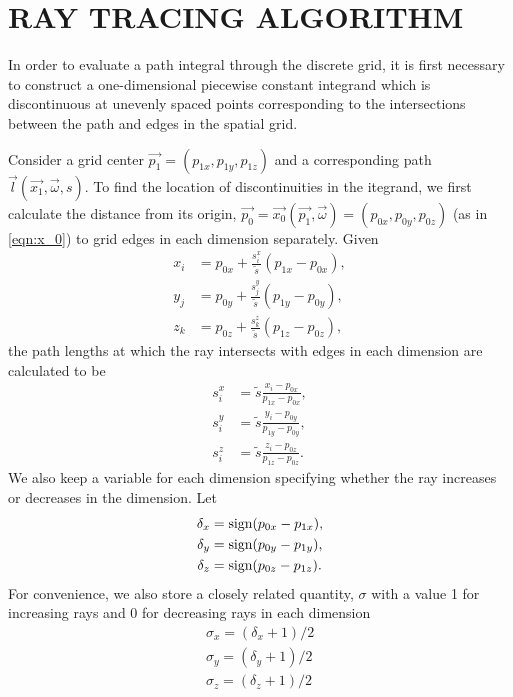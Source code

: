 \chapter{RAY TRACING ALGORITHM}
\label{chap:ray_tracing}


In order to evaluate a path integral through the discrete grid, it
is first necessary to construct a one-dimensional piecewise constant integrand
which is discontinuous at unevenly spaced points corresponding to the
intersections between the path and edges in the spatial grid.

Consider a grid center $\vec{p_1} = (p_{1x},p_{1y},p_{1z})$ and a corresponding path $\vec{l}(\vec{x_1}, \vec{\omega}, s)$.
To find the location of discontinuities in the itegrand, we first calculate the
distance from its origin, $\vec{p_0} = \vec{x_0}(\vec{p_1}, \vec{\omega}) = (p_{0x}, p_{0y}, p_{0z})$ (as in \eqref{eqn:x_0}) to grid edges in each dimension
separately.
Given
\begin{align}
  x_i &= p_{0x} + \frac{s_i^x}{\tilde{s}}(p_{1x}-p_{0x}), \\
  y_j &= p_{0y} + \frac{s_j^y}{\tilde{s}}(p_{1y}-p_{0y}), \\
  z_k &= p_{0z} + \frac{s_k^z}{\tilde{s}}(p_{1z}-p_{0z}),
\end{align}
the path lengths at which the ray intersects with edges in each dimension are calculated to be
\begin{align}
  s_i^x &= \tilde{s}\frac{x_i-p_{0x}}{p_{1x}-p_{0x}}, \\
  s_i^y &= \tilde{s}\frac{y_i-p_{0y}}{p_{1y}-p_{0y}}, \\
  s_i^z &= \tilde{s}\frac{z_i-p_{0z}}{p_{1z}-p_{0z}}.
\end{align}
We also keep a variable for each dimension specifying whether the ray increases
or decreases in the dimension. Let
\begin{align}
  \delta_x &= \mbox{sign}(p_{0x}-p_{1x}), \\
  \delta_y &= \mbox{sign}(p_{0y}-p_{1y}), \\
  \delta_z &= \mbox{sign}(p_{0z}-p_{1z}).
\end{align}
For convenience, we also store a closely related quantity, $\sigma$ with a value 1 for
increasing rays and 0 for decreasing rays in each dimension
\begin{align}
  \sigma_x = (\delta_x+1)/2 \\
  \sigma_y = (\delta_y+1)/2 \\
  \sigma_z = (\delta_z+1)/2
\end{align}

